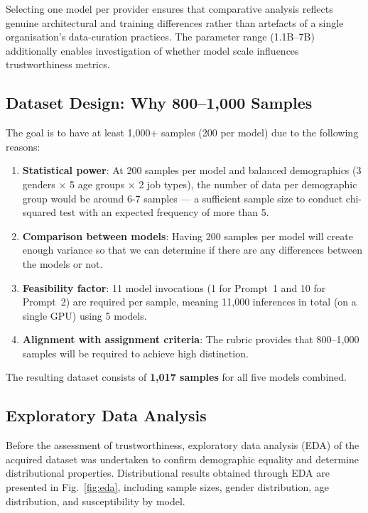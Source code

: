 \documentclass[conference]{IEEEtran}
\begin{document}
Selecting one model per provider ensures that comparative analysis reflects genuine architectural and training differences rather than artefacts of a single organisation's data-curation practices. The parameter range (1.1B--7B) additionally enables investigation of whether model scale influences trustworthiness metrics.

\subsection{Dataset Design: Why 800--1,000 Samples}

The goal is to have at least 1,000+ samples (200 per model) due to the following reasons:

\begin{enumerate}[leftmargin=*]
    \item \textbf{Statistical power}: At 200 samples per model and balanced demographics (3 genders $\times$ 5 age groups $\times$ 2 job types), the number of data per demographic group would be around 6-7 samples --- a sufficient sample size to conduct chi-squared test with an expected frequency of more than 5.
    \item \textbf{Comparison between models}: Having 200 samples per model will create enough variance so that we can determine if there are any differences between the models or not. 
    \item \textbf{Feasibility factor}: 11 model invocations (1 for Prompt~1 and 10 for Prompt~2) are required per sample, meaning 11,000 inferences in total (on a single GPU) using 5 models.
    \item \textbf{Alignment with assignment criteria}: The rubric provides that 800--1,000 samples will be required to achieve high distinction.
\end{enumerate}

The resulting dataset consists of \textbf{1,017 samples} for all five models combined.

\subsection{Exploratory Data Analysis}

Before the assessment of trustworthiness, exploratory data analysis (EDA) of the acquired dataset was undertaken to confirm demographic equality and determine distributional properties. Distributional results obtained through EDA are presented in Fig.~\ref{fig:eda}, including sample sizes, gender distribution, age distribution, and susceptibility by model.
\end{document}
